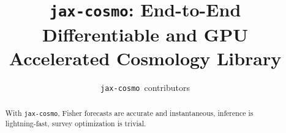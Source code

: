 \documentclass[final,5p,times,twocolumn,authoryear]{elsarticle}
\newcommand{\github}{\href{https://github.com/DifferentiableUniverseInitiative/jax\_cosmo}{\faGithub}}
\newcommand{\jaxcosmo}{\texttt{jax-cosmo}}
\begin{document}
\begin{frontmatter}



\title{\jaxcosmo: End-to-End Differentiable and GPU Accelerated Cosmology Library}


\author{\jaxcosmo\ contributors}

\address{}

\begin{abstract}
With \jaxcosmo, Fisher forecasts are accurate and instantaneous, inference is lightning-fast, survey optimization is trivial. \github
\end{abstract}



\begin{keyword}



\end{keyword}

\end{frontmatter}
\end{document}
